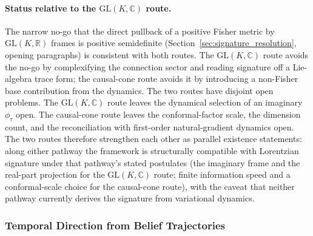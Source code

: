 \documentclass[11pt]{article}
\begin{document}
\paragraph{Status relative to the $\mathrm{GL}(K,\mathbb{C})$ route.}
The narrow no-go that the direct pullback of a positive Fisher metric by $\mathrm{GL}(K,\mathbb{R})$ frames is positive semidefinite (Section~\ref{sec:signature_resolution}, opening paragraphs) is consistent with both routes. The $\mathrm{GL}(K,\mathbb{C})$ route avoids the no-go by complexifying the connection sector and reading signature off a Lie-algebra trace form; the causal-cone route avoids it by introducing a non-Fisher base contribution from the dynamics. The two routes have disjoint open problems. The $\mathrm{GL}(K,\mathbb{C})$ route leaves the dynamical selection of an imaginary $\phi_\tau$ open. The causal-cone route leaves the conformal-factor scale, the dimension count, and the reconciliation with first-order natural-gradient dynamics open. The two routes therefore strengthen each other as parallel existence statements: along either pathway the framework is structurally compatible with Lorentzian signature under that pathway's stated postulates (the imaginary frame and the real-part projection for the $\mathrm{GL}(K,\mathbb{C})$ route; finite information speed and a conformal-scale choice for the causal-cone route), with the caveat that neither pathway currently derives the signature from variational dynamics.

\subsubsection{Temporal Direction from Belief Trajectories}
\end{document}
